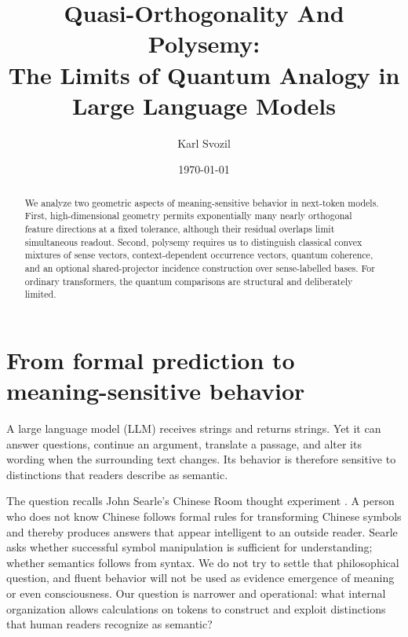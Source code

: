 \documentclass[
  aps,
  reprint,
  superscriptaddress,
  floatfix,
  nofootinbib,
  longbibliography
]{revtex4-2}
\begin{document}
\title{Quasi-Orthogonality And Polysemy:\\
The Limits of Quantum Analogy in Large Language Models}

\author{Karl Svozil}

\date{\today}

\begin{abstract}
We analyze two geometric aspects of meaning-sensitive behavior in next-token
models.  First, high-dimensional geometry permits exponentially many nearly
orthogonal feature directions at a fixed tolerance, although their residual
overlaps limit simultaneous readout.  Second, polysemy requires us to
distinguish classical convex mixtures of sense vectors, context-dependent
occurrence vectors, quantum coherence, and an optional shared-projector
incidence construction over sense-labelled bases.  For ordinary transformers,
the quantum comparisons are structural and deliberately limited.
\end{abstract}

\maketitle

\section{From formal prediction to meaning-sensitive behavior}
\label{sec:puzzle}

A large language model (LLM) receives strings and returns strings.  Yet it can
answer questions, continue an argument, translate a passage, and alter its
wording when the surrounding text changes.  Its behavior is therefore
sensitive to distinctions that readers describe as semantic.

The question recalls John Searle's Chinese Room thought experiment
\cite{searl-80a}.  A person who does not know Chinese follows formal rules for
transforming Chinese symbols and thereby produces answers that appear
intelligent to an outside reader.  Searle asks whether successful symbol
manipulation is sufficient for understanding; whether semantics follows from syntax.  We do not try to settle that
philosophical question, and fluent behavior will not be used as evidence emergence of meaning or even
consciousness.  Our question is narrower and operational: what internal
organization allows calculations on tokens to construct and exploit distinctions that
human readers recognize as semantic?
\end{document}
